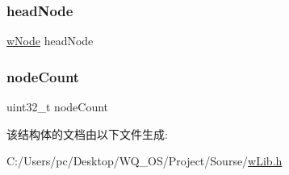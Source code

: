 \subsubsection{\texorpdfstring{head\+Node}{headNode}}
{\footnotesize\ttfamily \mbox{\hyperlink{w_lib_8h_a98363f2fc9ff1bef5993786140d900f2}{w\+Node}} head\+Node}

\mbox{\label{struct__w_list_a9ff3c0ff509d8eb055d29faa0ec185a1}} 
\subsubsection{\texorpdfstring{node\+Count}{nodeCount}}
{\footnotesize\ttfamily uint32\+\_\+t node\+Count}



该结构体的文档由以下文件生成\+:\begin{DoxyCompactItemize}
\item 
C\+:/\+Users/pc/\+Desktop/\+W\+Q\+\_\+\+O\+S/\+Project/\+Sourse/\mbox{\hyperlink{w_lib_8h}{w\+Lib.\+h}}\end{DoxyCompactItemize}
